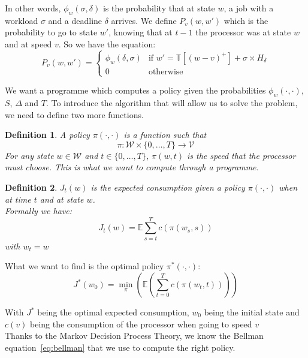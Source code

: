 \documentclass[
10pt, %
a4paper, %
oneside, %
headinclude,footinclude, %
BCOR5mm, %
]{scrartcl}
\newcommand{\V}{\mathcal{V}}
\newcommand{\T}{\mathbb{T}}
\newcommand{\W}{\mathcal{W}}
\newtheorem{defi}{Definition}
\begin{document}
In other words, $\phi_w(\sigma,\delta)$ is the probability that at state
$w$, a job with a workload $\sigma$ and a deadline $\delta$
arrives. We define $P_v(w,w')$ which is the probability to go to state
$w'$, knowing that at $t-1$ the processor was at state $w$ and at speed $v$.
So we have the equation:
\begin{equation}
  \label{eq:wtowp}
  P_v(w,w')=
  \begin{cases}
    \phi_w(\delta,\sigma) & \mbox{if } w'=\T[(w-v)^+]+\sigma\times
    H_\delta\\
    0 & \mbox{otherwise}
  \end{cases}
\end{equation}

We want a programme which computes a policy given the probabilities
$\phi_w(\cdot, \cdot)$, $S$, $\Delta$ and $T$.
To introduce the algorithm that will allow us to solve the problem, we
need to define two more functions.\\

\begin{defi}
  A policy $\pi(\cdot,\cdot)$ is a function such that
  \[
    \pi:\W\times \{0,\dots,T\}\rightarrow\V
  \]
  For any state $w\in\W$ and $t\in\{0,\dots,T\}$, $\pi(w,t)$ is the
  speed that the processor must choose. This is what we want to
  compute through a programme.
\end{defi}

\begin{defi}
  $J_t(w)$ is the expected consumption given a policy
  $\pi(\cdot,\cdot)$ when at time $t$ and at state $w$.\\
  Formally we have:\\
  \[
    J_t(w)=\mathbb{E}\sum_{s=t}^Tc(\pi(w_s,s))
  \]
  with $w_t=w$
\end{defi}

What we want to find is the optimal policy $\pi^*(\cdot,\cdot)$:
\begin{equation}
  \label{eq:rightpolicy}
  J^*(w_0)=\min_\pi \left(\mathbb{E}\left(\sum_{t=0}^Tc(\pi(w_t,t))\right)\right)
\end{equation}

With $J^*$ being the optimal expected consumption, $w_0$ being the
initial state and $c(v)$ being the consumption of the processor when
going to speed $v$\\

Thanks to the Markov Decision Process Theory, we know the Bellman
equation~\ref{eq:bellman} that we use to compute the right policy.
\end{document}
